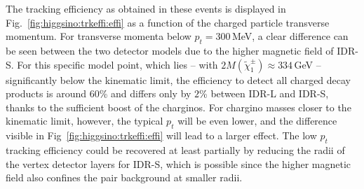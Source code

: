 The tracking efficiency  as obtained in these events is displayed in Fig.~\ref{fig:higgsino:trkeffi:effi} as a function of the charged particle transverse momentum. 
For transverse
momenta below $p_t = 300$\,MeV, a clear difference can be seen between the two detector models due to the higher magnetic field of IDR-S. For this specific model point, which lies -- with $2 M(\tilde{\chi}^{\pm}_1) \approx 334$\,GeV -- significantly below the kinematic limit, the efficiency to detect all charged decay products is around $60$\% and differs only by $2$\% between IDR-L and IDR-S, thanks to the sufficient boost of the charginos. For chargino masses closer to the kinematic limit, however, the typical $p_t$ will be even lower, 
and the difference visible in Fig~\ref{fig:higgsino:trkeffi:effi} will lead to a larger effect.
The low $p_t$ tracking efficiency could be recovered at least partially by reducing the radii of the vertex detector layers for IDR-S, which is possible since the higher magnetic field also confines the pair background at smaller radii.
